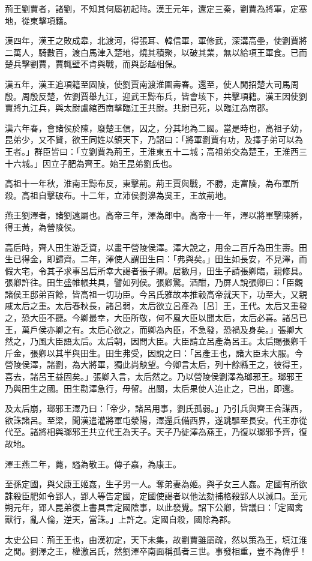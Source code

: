 
\begin{pinyinscope}
荊王劉賈者，諸劉，不知其何屬初起時。漢王元年，還定三秦，劉賈為將軍，定塞地，從東擊項籍。

漢四年，漢王之敗成皋，北渡河，得張耳、韓信軍，軍修武，深溝高壘，使劉賈將二萬人，騎數百，渡白馬津入楚地，燒其積聚，以破其業，無以給項王軍食。已而楚兵擊劉賈，賈輒壁不肯與戰，而與彭越相保。

漢五年，漢王追項籍至固陵，使劉賈南渡淮圍壽春。還至，使人閒招楚大司馬周殷。周殷反楚，佐劉賈舉九江，迎武王黥布兵，皆會垓下，共擊項籍。漢王因使劉賈將九江兵，與太尉盧綰西南擊臨江王共尉。共尉已死，以臨江為南郡。

漢六年春，會諸侯於陳，廢楚王信，囚之，分其地為二國。當是時也，高祖子幼，昆弟少，又不賢，欲王同姓以鎮天下，乃詔曰：「將軍劉賈有功，及擇子弟可以為王者。」群臣皆曰：「立劉賈為荊王，王淮東五十二城；高祖弟交為楚王，王淮西三十六城。」因立子肥為齊王。始王昆弟劉氏也。

高祖十一年秋，淮南王黥布反，東擊荊。荊王賈與戰，不勝，走富陵，為布軍所殺。高祖自擊破布。十二年，立沛侯劉濞為吳王，王故荊地。

燕王劉澤者，諸劉遠屬也。高帝三年，澤為郎中。高帝十一年，澤以將軍擊陳豨，得王黃，為營陵侯。

高后時，齊人田生游乏資，以畫干營陵侯澤。澤大說之，用金二百斤為田生壽。田生已得金，即歸齊。二年，澤使人謂田生曰：「弗與矣。」田生如長安，不見澤，而假大宅，令其子求事呂后所幸大謁者張子卿。居數月，田生子請張卿臨，親修具。張卿許往。田生盛帷帳共具，譬如列侯。張卿驚。酒酣，乃屏人說張卿曰：「臣觀諸侯王邸弟百餘，皆高祖一切功臣。今呂氏雅故本推轂高帝就天下，功至大，又親戚太后之重。太后春秋長，諸呂弱，太后欲立呂產為［呂］王，王代。太后又重發之，恐大臣不聽。今卿最幸，大臣所敬，何不風大臣以聞太后，太后必喜。諸呂已王，萬戶侯亦卿之有。太后心欲之，而卿為內臣，不急發，恐禍及身矣。」張卿大然之，乃風大臣語太后。太后朝，因問大臣。大臣請立呂產為呂王。太后賜張卿千斤金，張卿以其半與田生。田生弗受，因說之曰：「呂產王也，諸大臣未大服。今營陵侯澤，諸劉，為大將軍，獨此尚觖望。今卿言太后，列十餘縣王之，彼得王，喜去，諸呂王益固矣。」張卿入言，太后然之。乃以營陵侯劉澤為瑯邪王。瑯邪王乃與田生之國。田生勸澤急行，毋留。出關，太后果使人追止之，已出，即還。

及太后崩，瑯邪王澤乃曰：「帝少，諸呂用事，劉氏孤弱。」乃引兵與齊王合謀西，欲誅諸呂。至梁，聞漢遣灌將軍屯滎陽，澤還兵備西界，遂跳驅至長安。代王亦從代至。諸將相與瑯邪王共立代王為天子。天子乃徙澤為燕王，乃復以瑯邪予齊，復故地。

澤王燕二年，薨，謚為敬王。傳子嘉，為康王。

至孫定國，與父康王姬姦，生子男一人。奪弟妻為姬。與子女三人姦。定國有所欲誅殺臣肥如令郢人，郢人等告定國，定國使謁者以他法劾捕格殺郢人以滅口。至元朔元年，郢人昆弟復上書具言定國陰事，以此發覺。詔下公卿，皆議曰：「定國禽獸行，亂人倫，逆天，當誅。」上許之。定國自殺，國除為郡。

太史公曰：荊王王也，由漢初定，天下未集，故劉賈雖屬疏，然以策為王，填江淮之閒。劉澤之王，權激呂氏，然劉澤卒南面稱孤者三世。事發相重，豈不為偉乎！


\end{pinyinscope}